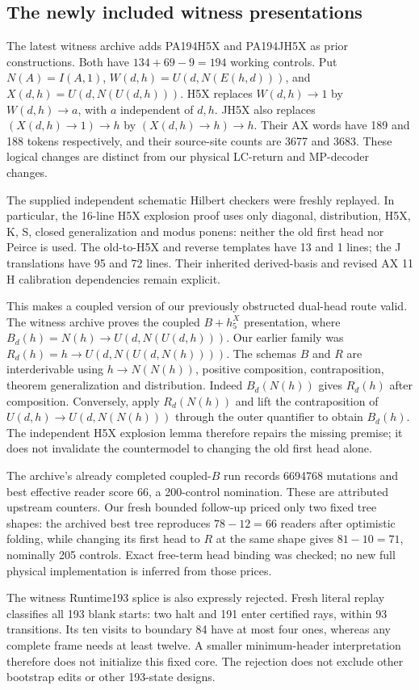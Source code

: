 \subsection{The newly included witness presentations}
The latest witness archive adds PA194H5X and PA194JH5X as prior constructions.
Both have $134+69-9=194$ working controls. Put
$N(A)=I(A,1)$, $W(d,h)=U(d,N(E(h,d)))$, and
$X(d,h)=U(d,N(U(d,h)))$. H5X replaces $W(d,h)\to 1$ by
$W(d,h)\to a$, with $a$ independent of $d,h$. JH5X also replaces
$(X(d,h)\to 1)\to h$ by $(X(d,h)\to h)\to h$.
Their AX words have 189 and 188 tokens respectively, and their source-site
counts are 3677 and 3683. These logical changes are distinct from our physical
LC-return and MP-decoder changes.

The supplied independent schematic Hilbert checkers were freshly replayed.
In particular, the 16-line H5X explosion proof uses only diagonal,
distribution, H5X, K, S, closed generalization and modus ponens: neither the
old first head nor Peirce is used. The old-to-H5X and reverse templates have
13 and 1 lines; the J translations have 95 and 72 lines. Their inherited
derived-basis and revised AX 11 H calibration dependencies remain explicit.

This makes a coupled version of our previously obstructed dual-head route
valid. The witness archive proves the coupled $B+h_5^X$ presentation, where
$B_d(h)=N(h)\to U(d,N(U(d,h)))$. Our earlier family was
$R_d(h)=h\to U(d,N(U(d,N(h))))$. The schemas $B$ and $R$ are interderivable
using $h\to N(N(h))$, positive composition, contraposition, theorem
generalization and distribution. Indeed $B_d(N(h))$ gives $R_d(h)$ after
composition. Conversely, apply $R_d(N(h))$ and lift the contraposition of
$U(d,h)\to U(d,N(N(h)))$ through the outer quantifier to obtain $B_d(h)$.
The independent H5X explosion lemma therefore repairs the missing premise;
it does not invalidate the countermodel to changing the old first head alone.

The archive's already completed coupled-$B$ run records 6694768 mutations and
best effective reader score 66, a 200-control nomination. These are attributed
upstream counters. Our fresh bounded follow-up priced only two fixed tree
shapes: the archived best tree reproduces $78-12=66$ readers after optimistic
folding, while changing its first head to $R$ at the same shape gives
$81-10=71$, nominally 205 controls. Exact free-term head binding was checked;
no new full physical implementation is inferred from those prices.

The witness Runtime193 splice is also expressly rejected. Fresh literal
replay classifies all 193 blank starts: two halt and 191 enter certified rays,
within 93 transitions. Its ten visits to boundary 84 have at most four ones,
whereas any complete frame needs at least twelve. A smaller minimum-header
interpretation therefore does not initialize this fixed core. The rejection
does not exclude other bootstrap edits or other 193-state designs.

